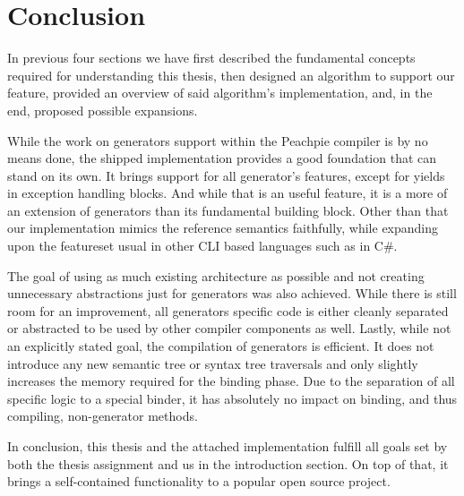 \chapter*{Conclusion}

In previous four sections we have first described the fundamental concepts required for understanding this thesis, then designed an algorithm to support our feature, provided an overview of said algorithm's implementation, and, in the end, proposed possible expansions.

While the work on generators support within the Peachpie compiler is by no means done, the shipped implementation provides a good foundation that can stand on its own. It brings support for all generator’s features, except for yields in exception handling blocks. And while that is an useful feature, it is a more of an extension of generators than its fundamental building block. Other than that our implementation mimics the reference semantics faithfully, while expanding upon the featureset usual in other CLI based languages such as in C\#.

The goal of using as much existing architecture as possible and not creating unnecessary abstractions just for generators was also achieved. While there is still room for an improvement, all generators specific code is either cleanly separated or abstracted to be used by other compiler components as well. 
Lastly, while not an explicitly stated goal, the compilation of generators is efficient. It does not introduce any new semantic tree or syntax tree traversals and only slightly increases the memory required for the binding phase. Due to the separation of all specific logic to a special binder, it has absolutely no impact on binding, and thus compiling, non-generator methods.

In conclusion, this thesis and the attached implementation fulfill all goals set by both the thesis assignment and us in the introduction section. On top of that, it brings a self-contained functionality to a popular open source project.
